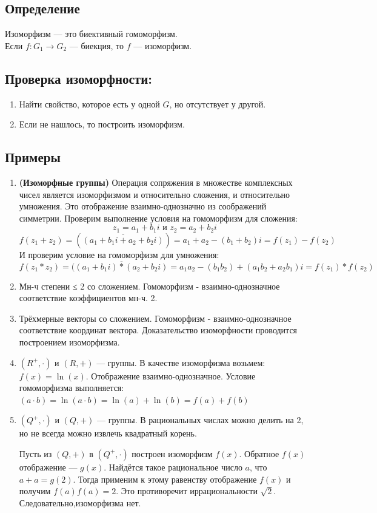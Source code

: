 \documentclass[12pt]{article}
\begin{document}
\subsection{Определение}
Изоморфизм --- это биективный гомоморфизм.\\Если $f:G_1\rightarrow G_2$ --- биекция, то $f$ --- изоморфизм.

\subsection{Проверка изоморфности:}
\begin{enumerate}
    \item Найти свойство, которое есть у одной $G$, но отсутствует у другой.
    \item Если не нашлось, то построить изоморфизм.
\end{enumerate}
\subsection{Примеры}
\begin{enumerate}
    \item \textbf{(Изоморфные группы)} Операция сопряжения в множестве комплексных чисел является изоморфизмом и относительно сложения, и относительно умножения. Это отображение взаимно-однозначно из соображений симметрии. Проверим выполнение условия на гомоморфизм для сложения:
          \[
              z_1 = a_1 + b_1i \text{ и } z_2 = a_2 + b_2i
          \]
          \[
              f(z_1+z_2) = (\overline{(a_1 + b_1i + a_2 + b_2i)}) = a_1 + a_2 - (b_1 + b_2)i = f(z_1) - f(z_2)
          \]
          И проверим условие на гомоморфизм для умножения:
          \[
              f(z_1*z_2)=(\overline{(a_1+b_1i)*(a_2+b_2i)}=a_1a_2-(b_1b_2)+(a_1b_2+a_2b_1)i=f(z_1)*f(z_2)
          \]
    \item
          Мн-ч степени ≤ 2 со сложением. Гомоморфизм - взаимно-однозначное соответствие коэффициентов мн-ч. 2.
    \item
          Трёхмерные векторы со сложением. Гомоморфизм - взаимно-однозначное соответствие координат вектора. Доказательство изоморфности проводится построением изоморфизма.
    \item
          $(R^+,\cdot)$ и $(R,+)$ --- группы. В качестве изоморфизма возьмем: $f(x) = \ln(x)$. Отображение взаимно-однозначное.
          Условие гомоморфизма выполняется: $(a · b) = \ln(a · b) = \ln(a) + \ln(b) = f(a) + f(b)$

    \item
          $(Q^+,\cdot)$ и $(Q,+)$ --- группы. В рациональных числах можно делить на 2, но не всегда можно извлечь квадратный корень.

          Пусть из $(Q,+)$ в $(Q^+, \cdot)$  построен изоморфизм $f(x)$. Обратное $f(x)$ отображение --- $g(x)$. Найдётся такое рациональное число $a$, что $a + a = g(2)$.
          Тогда применим к этому равенству отображение $f(x)$ и получим $f(a)f(a) = 2$. Это противоречит иррациональности $\sqrt{2}$. Следовательно,изоморфизма нет.
\end{enumerate}
\end{document}
